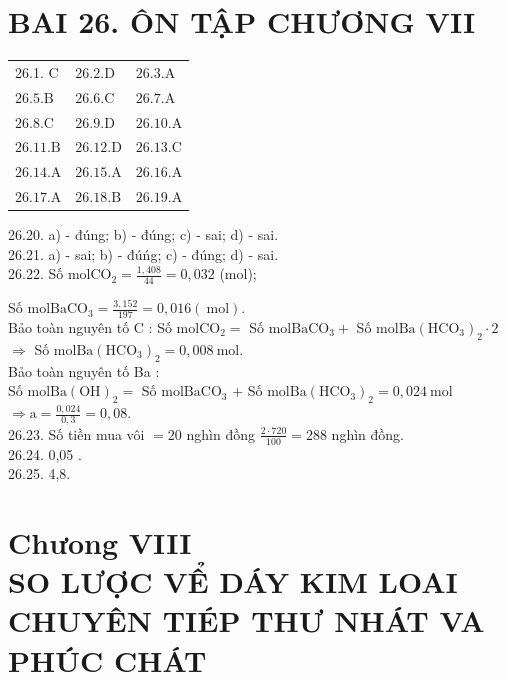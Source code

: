 \documentclass[10pt]{article}
\begin{document}
\section*{BAI 26. ÔN TẬP CHƯƠNG VII}
\begin{center}
\begin{tabular}{lll}
26.1. C & $26.2 . \mathrm{D}$ & $26.3 . \mathrm{A}$ \\
$26.5 . \mathrm{B}$ & $26.6 . \mathrm{C}$ & $26.7 . \mathrm{A}$ \\
$26.8 . \mathrm{C}$ & $26.9 . \mathrm{D}$ & $26.10 . \mathrm{A}$ \\
$26.11 . \mathrm{B}$ & $26.12 . \mathrm{D}$ & $26.13 . \mathrm{C}$ \\
$26.14 . \mathrm{A}$ & $26.15 . \mathrm{A}$ & $26.16 . \mathrm{A}$ \\
$26.17 . \mathrm{A}$ & $26.18 . \mathrm{B}$ & $26.19 . \mathrm{A}$ \\
\end{tabular}
\end{center}

26.20. a) - đúng; b) - đúng; c) - sai; d) - sai.\\
26.21. a) - sai; b) - đúńg; c) - đúng; d) - sai.\\
26.22. Số $\mathrm{mol} \mathrm{CO}_{2}=\frac{1,408}{44}=0,032$ (mol);

Số $\mathrm{mol} \mathrm{BaCO}_{3}=\frac{3,152}{197}=0,016(\mathrm{~mol})$.\\
Bảo toàn nguyên tố C : Số $\mathrm{mol} \mathrm{CO}_{2}=$ Số $\mathrm{mol} \mathrm{BaCO}_{3}+$ Số $\mathrm{mol} \mathrm{Ba}\left(\mathrm{HCO}_{3}\right)_{2} \cdot 2$\\
$\Rightarrow$ Số $\mathrm{mol} \mathrm{Ba}\left(\mathrm{HCO}_{3}\right)_{2}=0,008 \mathrm{~mol}$.\\
Bảo toàn nguyên tố Ba :\\
Số $\mathrm{mol} \mathrm{Ba}(\mathrm{OH})_{2}=$ Số $\mathrm{mol} \mathrm{BaCO}_{3}$ + Số $\mathrm{mol} \mathrm{Ba}\left(\mathrm{HCO}_{3}\right)_{2}=0,024 \mathrm{~mol}$\\
$\Rightarrow \mathrm{a}=\frac{0,024}{0,3}=0,08$.\\
26.23. Số tiền mua vôi $=20$ nghìn đồng $\frac{2 \cdot 720}{100}=288$ nghìn đồng.\\
26.24. 0,05 .\\
26.25. 4,8.

\section*{Chưong VIII \\
 SO LƯỢC VỂ DÁY KIM LOAI CHUYÊN TIÉP THƯ NHÁT VA PHÚC CHÁT}
\end{document}
